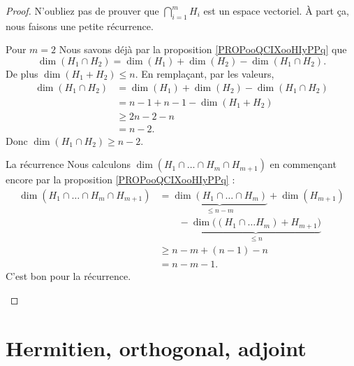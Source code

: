 \begin{proof}
    N'oubliez pas de prouver que \( \bigcap_{i=1}^mH_i\) est un espace vectoriel. À part ça, nous faisons une petite récurrence.
    \begin{subproof}
        \item[Pour \( m=2\)]
            Nous savons déjà par la proposition \ref{PROPooQCIXooHIyPPq} que
            \begin{equation}
                \dim(H_1\cap H_2)=\dim(H_1)+\dim(H_2)-\dim(H_1\cap H_2).
            \end{equation}
            De plus \( \dim(H_1+H_2)\leq n\). En remplaçant, par les valeurs,
            \begin{subequations}
                \begin{align}
                    \dim(H_1\cap H_2)&=\dim(H_1)+\dim(H_2)-\dim(H_1\cap H_2)\\
                    &=n-1+n-1-\dim(H_1+H_2)\\
                    &\geq 2n-2-n\\
                    &=n-2.
                \end{align}
            \end{subequations}
            Donc \( \dim(H_1\cap H_2)\geq n-2\).

        \item[La récurrence]
            Nous calculons \( \dim(H_1\cap\ldots\cap H_m\cap H_{m+1})\) en commençant encore par la proposition \ref{PROPooQCIXooHIyPPq} :
            \begin{subequations}
                \begin{align}
                    \dim(H_1\cap \ldots\cap H_m\cap H_{m+1})&=\underbrace{\dim(H_1\cap\ldots\cap H_m)}_{\leq n-m}+\dim(H_{m+1})\\
                        &\qquad -\underbrace{\dim\big( (H_1\cap\ldots H_m)+H_{m+1} \big)}_{\leq n}\\
                    &\geq n-m+(n-1)-n\\
                    &=n-m-1.
                \end{align}
            \end{subequations}
            C'est bon pour la récurrence.
    \end{subproof}
\end{proof}

\section{Hermitien, orthogonal, adjoint}

